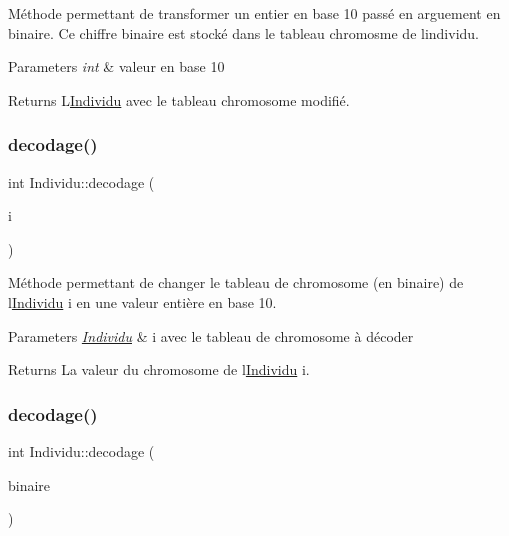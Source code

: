 Méthode permettant de transformer un entier en base 10 passé en arguement en binaire. Ce chiffre binaire est stocké dans le tableau chromosme de l\textquotesingle{}individu. 


\begin{DoxyParams}{Parameters}
{\em int} & valeur en base 10 \\
\hline
\end{DoxyParams}
\begin{DoxyReturn}{Returns}
L\textquotesingle{}\hyperlink{class_individu}{Individu} avec le tableau chromosome modifié. 
\end{DoxyReturn}
\mbox{\label{class_individu_a55c07f1851d61efae66419f76db56650}} 
\subsubsection{\texorpdfstring{decodage()}{decodage()}\hspace{0.1cm}{\footnotesize\ttfamily [1/2]}}
{\footnotesize\ttfamily int Individu\+::decodage (\begin{DoxyParamCaption}\item[{\hyperlink{class_individu}{Individu}}]{i }\end{DoxyParamCaption})}



Méthode permettant de changer le tableau de chromosome (en binaire) de l\textquotesingle{}\hyperlink{class_individu}{Individu} i en une valeur entière en base 10. 


\begin{DoxyParams}{Parameters}
{\em \hyperlink{class_individu}{Individu}} & i avec le tableau de chromosome à décoder \\
\hline
\end{DoxyParams}
\begin{DoxyReturn}{Returns}
La valeur du chromosome de l\textquotesingle{}\hyperlink{class_individu}{Individu} i. 
\end{DoxyReturn}
\mbox{\label{class_individu_ae1312d4f3e30f04bbfdac807ec68b7b6}} 
\subsubsection{\texorpdfstring{decodage()}{decodage()}\hspace{0.1cm}{\footnotesize\ttfamily [2/2]}}
{\footnotesize\ttfamily int Individu\+::decodage (\begin{DoxyParamCaption}\item[{int $\ast$}]{binaire }\end{DoxyParamCaption})}



